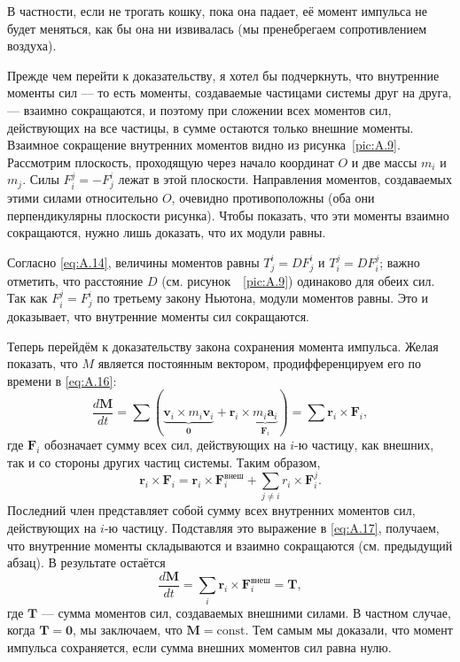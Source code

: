 В частности, если не трогать кошку, пока она падает, её момент импульса не будет меняться, как бы она ни извивалась (мы пренебрегаем сопротивлением воздуха).

Прежде чем перейти к доказательству, я хотел бы подчеркнуть, что
внутренние моменты сил — то есть моменты, создаваемые частицами системы друг на друга, — взаимно сокращаются,
и поэтому при сложении всех моментов сил, действующих на все частицы, в сумме остаются только внешние моменты.
Взаимное сокращение внутренних моментов видно из рисунка~\ref{pic:A.9}.
Рассмотрим плоскость, проходящую через начало координат $O$ и две массы $m_i$ и $m_j$.
Силы $F_{i}^{j} = -F_{j}^{i}$ лежат в этой плоскости.
Направления моментов, создаваемых этими силами относительно $O$, очевидно противоположны
(оба они перпендикулярны плоскости рисунка).
Чтобы показать, что эти моменты взаимно сокращаются, нужно лишь доказать, что их модули равны.

Согласно \eqref{eq:A.14}, величины моментов равны $T_{j}^{i} = D F_{j}^{i}$ и $T_{i}^{j} = D F_{i}^{j}$;
важно отметить, что расстояние $D$ (см. рисунок~~\ref{pic:A.9}) одинаково для обеих сил.
Так как $F_{i}^{j} = F_{j}^{i}$ по третьему закону Ньютона, модули моментов равны.
Это и доказывает, что внутренние моменты сил сокращаются.

Теперь перейдём к доказательству закона сохранения момента импульса.
Желая показать, что $M$ является постоянным вектором, продифференцируем его по времени в \eqref{eq:A.16}:
\begin{equation}
\frac{d\mathbf{M}}{dt}
= \sum \left( \underbrace{\mathbf{v}_i \times m_i \mathbf{v}_i}_{\mathbf{0}} + \mathbf{r}_i \times \underbrace{m_i \mathbf{a}_i}_{\mathbf{F}_i} \right)
= \sum \mathbf{r}_i \times \mathbf{F}_i,
\label{eq:A.17}
\end{equation}
где $\mathbf{F}_i$ обозначает сумму всех сил, действующих на $i$-ю частицу, как внешних, так и со стороны других частиц системы.
Таким образом,
\[
\mathbf{r}_i \times \mathbf{F}_i = \mathbf{r}_i \times \mathbf{F}_i^{\text{внеш}} + \sum_{j \ne i} r_i \times \mathbf{F}_{i}^{j}.
\]
Последний член представляет собой сумму всех внутренних моментов сил, действующих на $i$-ю частицу.
Подставляя это выражение в \eqref{eq:A.17}, получаем, что внутренние моменты складываются и взаимно сокращаются (см. предыдущий абзац).
В результате остаётся
\begin{equation}
\frac{d\mathbf{M}}{dt} = \sum_i \mathbf{r}_i \times \mathbf{F}_i^{\text{внеш}} = \mathbf{T},
\label{eq:A.18}
\end{equation}
где $\mathbf{T}$ — сумма моментов сил, создаваемых внешними силами.
В частном случае, когда $\mathbf{T} = \mathbf{0}$, мы заключаем, что $\mathbf{M} = \text{const}$.
Тем самым мы доказали, что момент импульса сохраняется, если сумма внешних моментов сил равна нулю.

